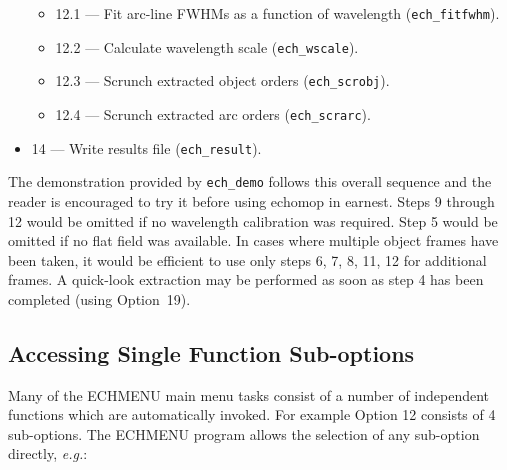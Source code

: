 \documentclass[11pt,twoside]{article}
\newcommand{\htmlref}[2]{#1}
\newcommand{\xlabel}[1]{}
\newcommand{\mlabel}[1]{\xlabel{#1}\label{#1}}
\newcommand{\myindex}[1]{\index{#1}}
\renewcommand{\myindex}[1]{}
\begin{document}
\begin{itemize}
\begin{itemize}
   \item {12.1 --- Fit arc-line FWHMs as a function of wavelength
         (\htmlref{{\tt{ech\_fitfwhm}}}{ech_fitfwhm}).}

   \item {12.2 --- Calculate wavelength scale
         (\htmlref{{\tt{ech\_wscale}}}{ech_wscale}).}

   \myindex{Scrunch!object}
   \item {12.3 --- Scrunch extracted object orders
         (\htmlref{{\tt{ech\_scrobj}}}{ech_scrobj}).}

   \myindex{Scrunch!arc}
   \myindex{Arc line!FWHM fit}
   \item {12.4 --- Scrunch extracted arc orders
         (\htmlref{{\tt{ech\_scrarc}}}{ech_scrarc}).}

\end{itemize}

\item {14 --- Write results file
      (\htmlref{{\tt{ech\_result}}}{ech_result}).}

\end{itemize}

\myindex{Output}
\myindex{Results}
\myindex{Demonstration}

The demonstration provided by \verb+ech_demo+ follows this overall sequence
and the reader is encouraged to try it before using {\sc echomop} in earnest.
\myindex{Wavelength calibration!none} Steps 9 through 12 would be omitted if
no wavelength calibration\myindex{Arc calibration!none} was required.
Step 5 would be omitted if no flat field was
available. \myindex{Multiple object frames}  In cases where multiple object
frames have been taken, it would be efficient to use only steps 6, 7, 8, 11,
12 for additional frames.\myindex{Quick-look extraction}
\myindex{Extraction!quick-look}  A quick-look extraction may be performed as
soon as step 4 has been completed (using Option~19).


\subsection{\mlabel{sub-options}Accessing Single Function Sub-options}
\myindex{Sub-options}

Many of the ECHMENU main menu tasks consist of a number of independent
functions which are automatically invoked. For example Option 12 consists
of 4 sub-options. The ECHMENU program allows the selection of any sub-option
directly, {\it{e.g.}}:
\end{document}
